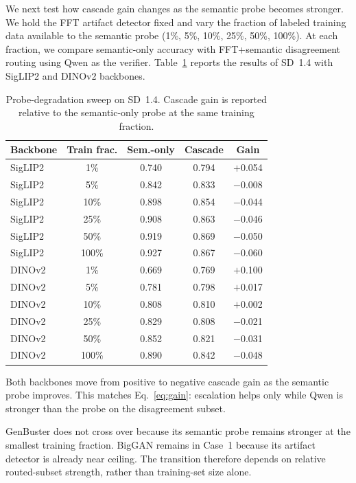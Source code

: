 \documentclass{ieeeaccess}
\begin{document}
We next test how cascade gain changes as the semantic probe becomes stronger. We hold
the FFT artifact detector fixed and vary the fraction of labeled training data available
to the semantic probe (1\%, 5\%, 10\%, 25\%, 50\%, 100\%). At each fraction, we compare
semantic-only accuracy with FFT+semantic disagreement routing using Qwen as the verifier.
Table~\ref{tab:limited_data} reports the results of SD~1.4 with SigLIP2 and DINOv2
backbones.

\begin{table}[h]
\centering
\caption{Probe-degradation sweep on SD~1.4. Cascade gain is reported relative to the semantic-only probe at the same training fraction.}
\label{tab:limited_data}
\small
\begin{tabular}{lcccc}
\toprule
Backbone & Train frac. & Sem.-only & Cascade & Gain \\
\midrule
SigLIP2  & 1\%   & 0.740 & 0.794 & $+$0.054 \\
SigLIP2  & 5\%   & 0.842 & 0.833 & $-$0.008 \\
SigLIP2  & 10\%  & 0.898 & 0.854 & $-$0.044 \\
SigLIP2  & 25\%  & 0.908 & 0.863 & $-$0.046 \\
SigLIP2  & 50\%  & 0.919 & 0.869 & $-$0.050 \\
SigLIP2  & 100\% & 0.927 & 0.867 & $-$0.060 \\
\midrule
DINOv2   & 1\%   & 0.669 & 0.769 & $+$0.100 \\
DINOv2   & 5\%   & 0.781 & 0.798 & $+$0.017 \\
DINOv2   & 10\%  & 0.808 & 0.810 & $+$0.002 \\
DINOv2   & 25\%  & 0.829 & 0.808 & $-$0.021 \\
DINOv2   & 50\%  & 0.852 & 0.821 & $-$0.031 \\
DINOv2   & 100\% & 0.890 & 0.842 & $-$0.048 \\
\bottomrule
\end{tabular}
\end{table}

Both backbones move from positive to negative cascade gain as the semantic probe
improves. This matches Eq.~\eqref{eq:gain}: escalation helps only while Qwen is stronger
than the probe on the disagreement subset.

GenBuster does not cross over because its semantic probe remains stronger at the smallest
training fraction. BigGAN remains in Case~1 because its artifact detector is already near
ceiling. The transition therefore depends on relative routed-subset strength, rather than
training-set size alone.
\end{document}
